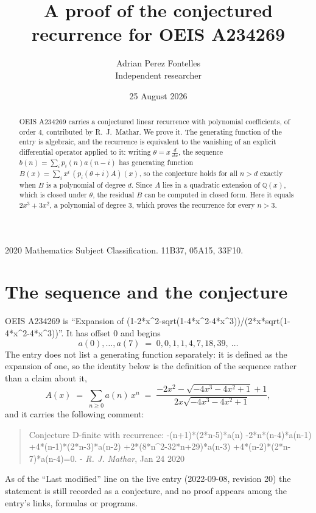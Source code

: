 \documentclass[11pt,a4paper]{article}
\title{A proof of the conjectured recurrence for OEIS A234269}
\author{Adrian Perez Fontelles\\ \small Independent researcher}
\date{25 August 2026}
\theoremstyle{plain}
\theoremstyle{definition}
\begin{document}
\maketitle

\begin{abstract}
OEIS A234269 carries a conjectured linear recurrence with polynomial coefficients, of
order 4, contributed by R.~J.~Mathar. We prove it. The generating function of the
entry is algebraic, and the recurrence is equivalent to the vanishing of an explicit
differential operator applied to it: writing $\theta=x\,\frac{d}{dx}$, the sequence
$b(n)=\sum_{i}p_{i}(n)a(n-i)$ has generating function
$B(x)=\sum_{i}x^{i}\,(p_{i}(\theta+i)A)(x)$, so the conjecture holds for all $n>d$ exactly
when $B$ is a polynomial of degree $d$. Since $A$ lies in a quadratic extension of
$\mathbb{Q}(x)$, which is closed under $\theta$, the residual $B$ can be computed in
closed form. Here it equals $2 x^{3} + 3 x^{2}$, a polynomial of degree $3$, which proves
the recurrence for every $n>3$.
\end{abstract}

\noindent\small 2020 Mathematics Subject Classification. 11B37, 05A15, 33F10.\normalsize

\section{The sequence and the conjecture}

OEIS A234269 is ``Expansion of (1-2*x\^{}2-sqrt(1-4*x\^{}2-4*x\^{}3))/(2*x*sqrt(1-4*x\^{}2-4*x\^{}3))''. It has offset $0$ and begins
\[
a(0),\dots,a(7)\;=\;0, 0, 1, 1, 4, 7, 18, 39,\ \dots
\]
The entry does not list a generating function separately: it is defined as the
expansion of one, so the identity below is the definition of the sequence rather than a
claim about it,
\begin{equation}\label{eq:gf}
A(x)\;=\;\sum_{n\ge 0} a(n)\,x^{n}\;=\;\frac{- 2 x^{2} - \sqrt{- 4 x^{3} - 4 x^{2} + 1} + 1}{2 x \sqrt{- 4 x^{3} - 4 x^{2} + 1}} ,
\end{equation}
and it carries the following comment:
\begin{quote}\small
Conjecture D-finite with recurrence: -(n+1)*(2*n-5)*a(n) -2*n*(n-4)*a(n-1) +4*(n-1)*(2*n-3)*a(n-2) +2*(8*n\^{}2-32*n+29)*a(n-3) +4*(n-2)*(2*n-7)*a(n-4)=0. - \emph{R. J. Mathar}, Jan 24 2020
\end{quote}
As of the ``Last modified'' line on the live entry (2022-09-08, revision 20) the
statement is still recorded as a conjecture, and no proof appears among the entry's links,
formulas or programs.
\end{document}
